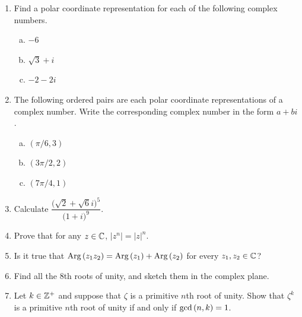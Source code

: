 \documentclass[11pt,fleqn,dvipsnames,usenames]{article}
\begin{document}
\begin{enumerate}
\item Find a polar coordinate representation for each of the following complex numbers.
\begin{multicols}{3}
\begin{enumerate}[(a)]
\item $-6$
\item $\sqrt{3} + i$
\item $-2-2i$
\end{enumerate}
\end{multicols}
\item The following ordered pairs are each polar coordinate representations of a complex number.  Write the corresponding complex number in the form $a + bi$.
\begin{multicols}{3}
\begin{enumerate}[(a)]
\item $(\pi/6,3)$
\item $(3\pi/2,2)$
\item $(7\pi/4,1)$
\end{enumerate}
\end{multicols}
\item Calculate $\dfrac{\big(\sqrt{2} + \sqrt{6}i\big)^5}{\big(1+i\big)^9}$.
\item Prove that for any $z\in\mathbb{C}$, $|z^{n}| = |z|^{n}$.
\item Is it true that $\text{Arg}\left(z_1z_2\right) = \text{Arg}\left(z_1\right) + \text{Arg}\left(z_2\right)$ for every $z_{1},z_{2}\in\mathbb{C}$?
\item Find all the $8$th roots of unity, and sketch them in the complex plane.
\item Let $k\in\mathbb{Z}^{+}$ and suppose that $\zeta$ is a primitive $n$th root of unity.  Show that $\zeta^{k}$ is a primitive $n$th root of unity if and only if $\text{gcd}\left(n,k\right) = 1$.
\end{enumerate}
\vsp


\end{document}
